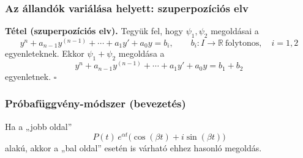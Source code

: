 \subsubsection*{Az állandók variálása helyett: szuperpozíciós elv}
\begin{matbox}
\textbf{Tétel (szuperpozíciós elv).}
Tegyük fel, hogy $\psi_1,\psi_2$ megoldásai a
\[
 y^n+a_{n-1}y^{(n-1)}+\cdots+a_1y'+a_0y=b_i,
 \qquad b_i:I\longrightarrow\mathbb R\ \text{folytonos},
 \quad i=1,2
\]
egyenleteknek. Ekkor $\psi_1+\psi_2$ megoldása a
\[
 y^n+a_{n-1}y^{(n-1)}+\cdots+a_1y'+a_0y=b_1+b_2
\]
egyenletnek. $\square$
\end{matbox}

\subsubsection*{Próbafüggvény-módszer (bevezetés)}
Ha a „jobb oldal”
\[
 P(t)\,e^{\alpha t}
 \bigl(\cos(\beta t)+i\sin(\beta t)\bigr)
\]
alakú, akkor a „bal oldal” esetén is várható ehhez hasonló megoldás.

